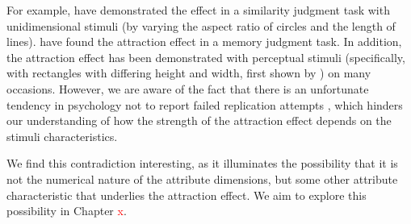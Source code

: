 \documentclass[11pt,a4paper]{article}
\begin{document}
For example,  have demonstrated the effect in a similarity judgment task with unidimensional stimuli (by varying the aspect ratio of circles and the length of lines).  have found the attraction effect in a memory judgment task. In addition, the attraction effect has been demonstrated with perceptual stimuli (specifically, with rectangles with differing height and width, first shown by ) on many occasions.  However, we are aware of the fact that there is an unfortunate tendency in psychology not to report failed replication attempts \cite{Ingre2015}, which hinders our understanding of how the strength of the attraction effect depends on the stimuli characteristics.

We find this contradiction interesting, as it illuminates the possibility that it is not the numerical nature of the attribute dimensions, but some other attribute characteristic that underlies the attraction effect. We aim to explore this possibility in Chapter \textcolor{red}{x}.














\newpage


\end{document}
